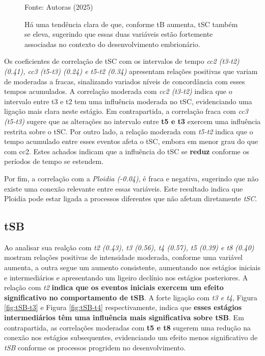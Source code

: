 \begin{figure}[h]
\begin{minipage}[b]{0.45\linewidth}
        \vspace{0.3cm}
        \caption{Há uma tendência clara de que, conforme tB aumenta, tSC também se eleva, sugerindo que essas duas variáveis estão fortemente associadas no contexto do desenvolvimento embrionário. }
        \begin{minipage}{\linewidth}
            \centering
            \scriptsize{Fonte: Autoras (2025)}
        \end{minipage}
    \end{minipage}
\end{figure}
\FloatBarrier

Os coeficientes de correlação de tSC com os intervalos de tempo \textit{cc2 (t3-t2) (0.41), cc3 (t5-t3) (0.24) e t5-t2 (0.34)} apresentam relações positivas que variam de moderadas a fracas, sinalizando variados níveis de concordância com esses tempos acumulados. A correlação moderada com \textit{cc2 (t3-t2)} indica que o intervalo entre t3 e t2 tem uma influência moderada no tSC, evidenciando uma ligação mais clara neste estágio. Em contrapartida, a correlação fraca com \textit{cc3 (t5-t3)} sugere que as alterações no intervalo entre \textbf{t5 e t3} exercem uma influência restrita sobre o tSC. Por outro lado, a relação moderada com \textit{t5-t2} indica que o tempo acumulado entre esses eventos afeta o tSC, embora em menor grau do que com cc2. Estes achados indicam que a influência do tSC se \textbf{reduz} conforme os períodos de tempo se estendem.

Por fim, a correlação com a \textit{Ploidia (-0.04)}, é fraca e negativa, sugerindo que não existe uma conexão relevante entre essas variáveis. Este resultado indica que Ploidia pode estar ligada a processos diferentes que não afetam diretamente \textit{tSC}.

\subsection*{tSB}
Ao analisar sua realção com \textit{t2 (0.43), t3 (0.56), t4 (0.57), t5 (0.39) e t8 (0.40)} mostram relações positivas de intensidade moderada, conforme uma variável aumenta, a outra segue um aumento consistente, aumentando nos estágios iniciais e intermediários e apresentando um ligeiro declínio nos estágios posteriores. A relação com \textit{t2} \textbf{indica que os eventos iniciais exercem um efeito significativo no comportamento de \textbf{tSB}}. A forte ligação com \textit{t3 e t4}, Figura \ref{fig:tSB-t3} e Figura \ref{fig:tSB-t4} respectivamente, indica que \textbf{esses estágios intermediários têm uma influência mais significativa sobre \textbf{tSB}}. Em contrapartida, as correlações moderadas com \textbf{t5 e t8} sugerem uma redução na conexão nos estágios subsequentes, evidenciando um efeito menos significativo de \textit{tSB} conforme os processos progridem no desenvolvimento.

